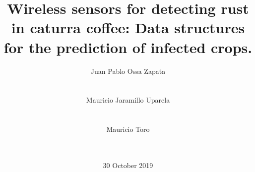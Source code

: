 \documentclass{acm_proc_article-sp}
\begin{document}
\title{Wireless sensors for detecting rust in caturra coffee: Data structures for the prediction of infected crops.}
%
%
%
%
%

%
\author{
%
%
\alignauthor
Juan Pablo Ossa Zapata\\
       \\
       \\
\alignauthor
Mauricio Jaramillo Uparela\\
       \\
       \\
\alignauthor
Mauricio Toro\\
        \\
        \\
        }
\date{30 October 2019}
\end{document}
